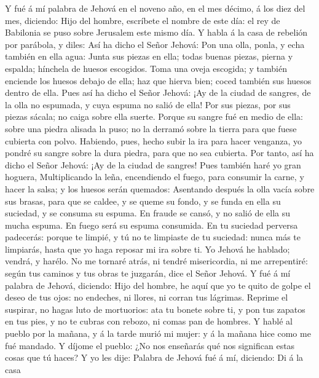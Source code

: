  Y fué á mí palabra de Jehová en el noveno año, en el mes
décimo, á los diez del mes, diciendo:  Hijo del hombre,
escríbete el nombre de este día: el rey de Babilonia se puso sobre
Jerusalem este mismo día.  Y habla á la casa de rebelión por
parábola, y diles: Así ha dicho el Señor Jehová: Pon una olla, ponla, y
echa también en ella agua:  Junta sus piezas en ella; todas
buenas piezas, pierna y espalda; hínchela de huesos escogidos.
 Toma una oveja escogida; y también enciende los huesos
debajo de ella; haz que hierva bien; coced también sus huesos dentro de
ella.  Pues así ha dicho el Señor Jehová: ¡Ay de la ciudad
de sangres, de la olla no espumada, y cuya espuma no salió de ella! Por
sus piezas, por sus piezas sácala; no caiga sobre ella suerte.
 Porque su sangre fué en medio de ella: sobre una piedra
alisada la puso; no la derramó sobre la tierra para que fuese cubierta
con polvo.  Habiendo, pues, hecho subir la ira para hacer
venganza, yo pondré su sangre sobre la dura piedra, para que no sea
cubierta.  Por tanto, así ha dicho el Señor Jehová: ¡Ay de
la ciudad de sangres! Pues también haré yo gran hoguera, 
Multiplicando la leña, encendiendo el fuego, para consumir la carne, y
hacer la salsa; y los huesos serán quemados:  Asentando
después la olla vacía sobre sus brasas, para que se caldee, y se queme
su fondo, y se funda en ella su suciedad, y se consuma su espuma.
 En fraude se cansó, y no salió de ella su mucha espuma. En
fuego será su espuma consumida.  En tu suciedad perversa
padecerás: porque te limpié, y tú no te limpiaste de tu suciedad: nunca
más te limpiarás, hasta que yo haga reposar mi ira sobre ti.
 Yo Jehová he hablado; vendrá, y harélo. No me tornaré
atrás, ni tendré misericordia, ni me arrepentiré: según tus caminos y
tus obras te juzgarán, dice el Señor Jehová.  Y fué á mí
palabra de Jehová, diciendo:  Hijo del hombre, he aquí que
yo te quito de golpe el deseo de tus ojos: no endeches, ni llores, ni
corran tus lágrimas.  Reprime el suspirar, no hagas luto de
mortuorios: ata tu bonete sobre ti, y pon tus zapatos en tus pies, y no
te cubras con rebozo, ni comas pan de hombres.  Y hablé al
pueblo por la mañana, y á la tarde murió mi mujer: y á la mañana hice
como me fué mandado.  Y díjome el pueblo: ¿No nos enseñarás
qué nos significan estas cosas que tú haces?  Y yo les
dije: Palabra de Jehová fué á mí, diciendo:  Di á la casa
